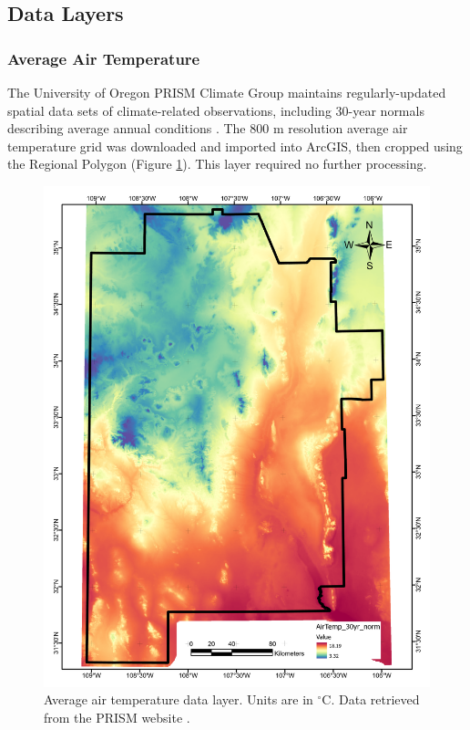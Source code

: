 \subsection{Data Layers}\label{ch3:layers}

\subsubsection{Average Air Temperature}

The University of Oregon PRISM Climate Group maintains regularly-updated spatial data sets of climate-related observations, including 30-year normals describing average annual conditions \citep{daly_physiographically_2008, prism_prism_2021}. The 800 m resolution average air temperature grid was downloaded and imported into ArcGIS, then cropped using the Regional Polygon (Figure \ref{fig:feat_airtemp}). This layer required no further processing.

\begin{figure}[!htp]
\centering
\includegraphics[scale=.50]{templates/images/Figure-AvgAirTemp.pdf}
\caption[Average air temperature data layer]{Average air temperature data layer. Units are in $^\circ$C. Data retrieved from the PRISM website \protect\citep{prism_prism_2021}.}
\label{fig:feat_airtemp}
\end{figure}

